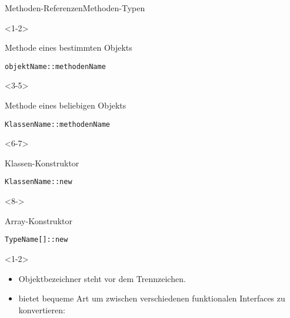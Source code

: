 \begin{frame}[fragile]{Methoden-Referenzen}{Methoden-Typen}
    \begin{center}
        \begin{minipage}[b]{0.75\textwidth}
            \begin{onlyenv}<1-2>
                \begin{block}{Methode eines bestimmten Objekts \citep{goetz13}}
                    \begin{lstlisting}
objektName::methodenName
                    \end{lstlisting}
                \end{block}
            \end{onlyenv}
            \begin{onlyenv}<3-5>
                \begin{block}{Methode eines beliebigen Objekts \citep{goetz13}}
                    \begin{lstlisting}
KlassenName::methodenName
                    \end{lstlisting}
                \end{block}
            \end{onlyenv}
            \begin{onlyenv}<6-7>
                \begin{block}{Klassen-Konstruktor \citep{goetz13}}
                    \begin{lstlisting}
KlassenName::new
                    \end{lstlisting}
                \end{block}
            \end{onlyenv}
            \begin{onlyenv}<8->
                \begin{block}{Array-Konstruktor \citep{goetz13}}
                    \begin{lstlisting}
TypeName[]::new
                    \end{lstlisting}
                \end{block}
            \end{onlyenv}

        \end{minipage}
    \end{center}

    \begin{onlyenv}<1-2>
        \begin{itemize}
            \item<1-> Objektbezeichner steht vor dem Trennzeichen.
            \item<2-> bietet bequeme Art um zwischen verschiedenen funktionalen Interfaces zu konvertieren:
        \end{itemize}


\end{onlyenv}
\end{frame}
